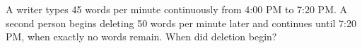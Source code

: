 A writer types 45 words per minute continuously from 4:00 PM to 7:20 PM. A second person begins deleting 50 words per minute later and continues until 7:20 PM, when exactly no words remain. When did deletion begin?
